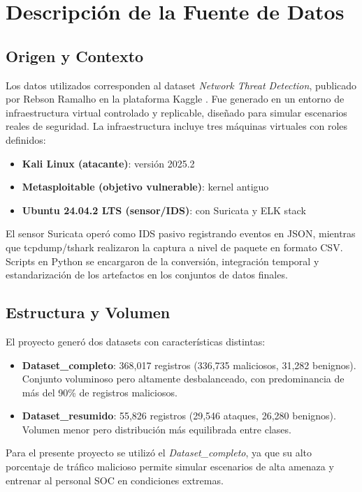 \documentclass[conference]{IEEEtran}
\begin{document}
\section{Descripci\'on de la Fuente de Datos}

\subsection{Origen y Contexto}
Los datos utilizados corresponden al dataset \textit{Network Threat Detection}, publicado por Rebson Ramalho en la plataforma Kaggle \cite{kaggle_dataset}. Fue generado en un entorno de infraestructura virtual controlado y replicable, dise\~nado para simular escenarios reales de seguridad. La infraestructura incluye tres m\'aquinas virtuales con roles definidos:

\begin{itemize}
    \item \textbf{Kali Linux (atacante)}: versi\'on 2025.2
    \item \textbf{Metasploitable (objetivo vulnerable)}: kernel antiguo
    \item \textbf{Ubuntu 24.04.2 LTS (sensor/IDS)}: con Suricata y ELK stack
\end{itemize}

El sensor Suricata oper\'o como IDS pasivo registrando eventos en JSON, mientras que tcpdump/tshark realizaron la captura a nivel de paquete en formato CSV. Scripts en Python se encargaron de la conversi\'on, integraci\'on temporal y estandarizaci\'on de los artefactos en los conjuntos de datos finales.

\subsection{Estructura y Volumen}
El proyecto gener\'o dos datasets con caracter\'isticas distintas:

\begin{itemize}
    \item \textbf{Dataset\_completo}: 368,017 registros (336,735 maliciosos, 31,282 benignos). Conjunto voluminoso pero altamente desbalanceado, con predominancia de m\'as del 90\% de registros maliciosos.
    \item \textbf{Dataset\_resumido}: 55,826 registros (29,546 ataques, 26,280 benignos). Volumen menor pero distribuci\'on m\'as equilibrada entre clases.
\end{itemize}

Para el presente proyecto se utiliz\'o el \textit{Dataset\_completo}, ya que su alto porcentaje de tr\'afico malicioso permite simular escenarios de alta amenaza y entrenar al personal SOC en condiciones extremas.
\end{document}
